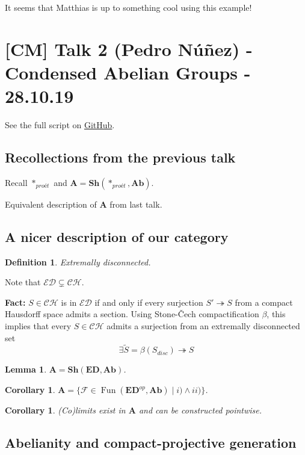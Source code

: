 \documentclass[12pt]{article}
\theoremstyle{darkgreentheorem}
\newtheorem{lm}[thm]{Lemma}
\newtheorem{cor}[thm]{Corollary}
\theoremstyle{darkbluedefinition}
\newtheorem{defn}[thm]{Definition}
\theoremstyle{darkredexample}
\theoremstyle{remark}
\newcommand{\1}{\mathbbm{1}}
\newcommand{\ED}{\mathbf{ED}}
\newcommand{\A}{\mathbf{A}}
\newcommand{\Ab}{\mathbf{Ab}}
\newcommand{\Sh}{\mathbf{Sh}}
\newcommand{\F}{\mathcal{F}}
\DeclareMathOperator{\Fun}{Fun}
\newcommand{\pe}{*_{proét}}
\begin{document}
It seems that Matthias is up to something cool using this example!

\section{[CM] Talk 2 (Pedro Núñez) - Condensed Abelian Groups - 28.10.19}

See the full script on \href{https://github.com/pedro-nlb/cag}{GitHub}.

\subsection{Recollections from the previous talk}

Recall $\pe$ and $\A=\Sh(\pe,\Ab)$.

Equivalent description of $\A$ from last talk.

\subsection{A nicer description of our category}

\begin{defn}
    Extremally disconnected.
\end{defn}

Note that $\mathscr{ED}\subsetneq \mathscr{CH}$.

\textbf{Fact:} $S\in \mathscr{CH}$ is in $\mathscr{ED}$ if and only if every surjection $S'\twoheadrightarrow S$ from a compact Hausdorff space admits a section.
Using Stone-\v{C}ech compactification $\beta$, this implies that every $S\in \mathscr{CH}$ admits a surjection from an extremally disconnected set
\[ \exists \tilde{S}=\beta(S_{disc})\twoheadrightarrow S \]

\begin{lm}
    $\A=\Sh(\ED,\Ab)$.
\end{lm}

\begin{cor}
$\A=\{ \F\in \Fun(\ED^{op},\Ab)\mid i) \wedge ii)\}$.
\end{cor}

\begin{cor}
(Co)limits exist in $\A$ and can be constructed pointwise.
\end{cor}

\subsection{Abelianity and compact-projective generation}
\end{document}
